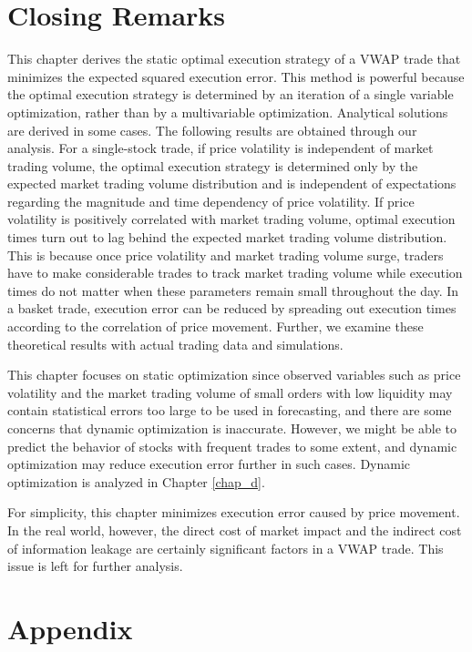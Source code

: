 \section{Closing Remarks}\label{sec_s5}
This chapter derives the static optimal execution strategy of a VWAP trade that minimizes the expected squared execution error.  This method is powerful because the optimal execution strategy is determined by an iteration of a single variable optimization, rather than by a multivariable optimization.  Analytical solutions are derived in some cases.  The following results are obtained through our analysis.  For a single-stock trade, if price volatility is independent of market trading volume, the optimal execution strategy is determined only by the expected market trading volume distribution and is independent of expectations regarding the magnitude and time dependency of price volatility.  If price volatility is positively correlated with market trading volume, optimal execution times turn out to lag behind the expected market trading volume distribution.  This is because once price volatility and market trading volume surge, traders have to make considerable trades to track market trading volume while execution times do not matter when these parameters remain small throughout the day.  In a basket trade, execution error can be reduced by spreading out execution times according to the correlation of price movement.  Further, we examine these theoretical results with actual trading data and simulations.

This chapter focuses on static optimization since observed variables such as price volatility and the market trading volume of small orders with low liquidity may contain statistical errors too large to be used in forecasting, and there are some concerns that dynamic optimization is inaccurate.  However, we might be able to predict the behavior of stocks with frequent trades to some extent, and dynamic optimization may reduce execution error further in such cases.  Dynamic optimization is analyzed in Chapter \ref{chap_d}.

For simplicity, this chapter minimizes execution error caused by price movement.  In the real world, however, the direct cost of market impact and the indirect cost of information leakage are certainly significant factors in a VWAP trade.  This issue is left for further analysis.


\section{Appendix}\label{sec_sappendix}

